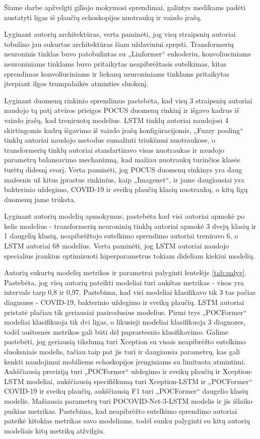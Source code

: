 \documentclass[fleqn]{VUMIFKompMagistrinis}
\begin{document}
Šiame darbe apžvelgti giliojo mokymosi sprendimai, galintys medikams padėti nustatyti ligas iš plaučių echoskopijos nuotraukų ir vaizdo įrašų.
\par
Lyginant autorių architektūras, verta paminėti, jog visų straipsnių autoriai tobulino jau sukurtas architektūras šiam uždaviniui spręsti. Transformerių neuroninis tinklas buvo patobulintas su „Linformer“ enkoderiu, konvoliuciniams neuroniniams tinklams buvo pritaikytas neapibrėžtasis sutelkimas, kitas sprendimas konvoliuciniams ir liekanų neuroniniams tinklams pritaikytas įterpiant ilgos trumpalaikės atminties sluoksnį.
\par
Lyginant duomenų rinkinio sprendimus pastebėta, kad visų 3 straipsnių autoriai naudojo tą patį atviros prieigos POCUS duomenų rinkinį ir išgavo kadrus iš vaizdo įrašų, kad treniruotų modelius. LSTM tinklų autoriai naudojosi 4 skirtingomis kadrų išgavimo iš vaizdo įrašų konfigūracijomis, „Fuzzy pooling“ tinklų autoriai naudojo metodus sumažinti triukšmui nuotraukose, o transformerių tinklų autoriai standartizavo visas nuotraukas ir naudojo parametrų balansavimo mechanizmą, kad mažiau nuotraukų turinčios klasės turėtų didesnį svorį. Verta paminėti, jog POCUS duomenų rinkinys yra daug mažesnis už kitus įprastus rinkinius, kaip „Imagenet“, ir jame daugiausiai yra bakterinio uždegimo, COVID-19 ir sveikų plaučių klasių nuotraukų, o kitų ligų duomenų jame trūksta.
\par
Lyginant autorių modelių apmokymus, pastebėta kad visi autoriai apmokė po kelis modelius - transformerių neuroninių tinklų autoriai apmokė 3 dvejų klasių ir 1 daugelių klasių, neapibrėžtojo sutelkimo sprendimo autoriai treniravo 6, o LSTM autoriai 68 modelius. Verta paminėti, jog LSTM autoriai naudojo specialius įrankius optimizuoti hiperparametrus tokiam dideliam kiekiui modelių.
\par
Autorių sukurtų modelių metrikos ir parametrai palyginti lentelėje \ref{tab:palyg}. Pastebėta, jog visų autorių pateikti modeliai turi aukštas metrikas - visos yra intervale tarp 0,8 ir 0,97. Pastebima, kad visi modeliai klasifikavo tik 3 tas pačias diagnozes - COVID-19, bakterinio uždegimo ir sveikų plaučių. LSTM autoriai pristatė plačiau tik geriausiai pasirodusius modelius. Pirmi trys „POCFormer“ modeliai klasifikuoja tik dvi ligas, o likusieji modeliai klasifikuoja 3 diagnozes, todėl auštesnės metrikos gali būti dėl paprastesnio klasifikavimo. Galime pastebėti, jog geriausią tikslumą turi Xception su visais neapibrėžto sutelkimo sluoksniais modelis, tačiau taip pat jis turi ir daugiausia parametrų, kas gali kenkti naudojimui mobiliems echoskopijos įrenginiams su limituota atmintimi. Aukščiausią preciziją turi „POCFormer“ uždegimo ir sveikų plaučių ir Xception-LSTM modeliai, aukščiausią specifiškumą turi Xception-LSTM ir „POCFormer“ COVID-19 ir sveikų plaučių, aukščiausią F1 turi „POCFormer“ daugelio klasių modelis. Mažiausia parametrų turi POCOVID-Net-3-LSTM modelis ir jis išlaiko puikias metrikas. Pastebima, kad neapibrėžto sutelkimo sprendimo autoriai pateikė kitokias metrikas savo modeliams, todėl sunku palyginti su kitų autorių modeliais kitų metrikų atžvilgiu. 
\end{document}
